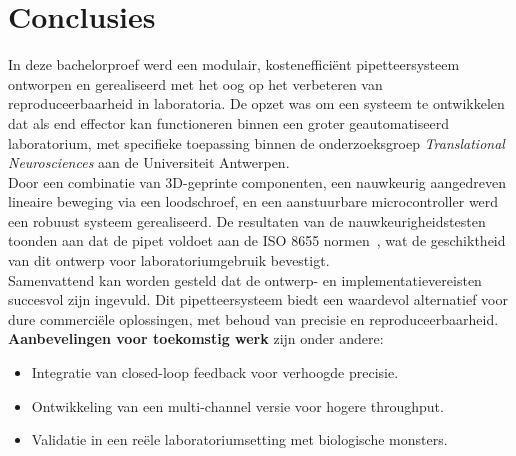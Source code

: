 \chapter{Conclusies}
In deze bachelorproef werd een modulair, kostenefficiënt pipetteersysteem ontworpen en gerealiseerd met het oog op het verbeteren van reproduceerbaarheid in laboratoria. De opzet was om een systeem te ontwikkelen dat als end effector kan functioneren binnen een groter geautomatiseerd laboratorium, met specifieke toepassing binnen de onderzoeksgroep \textit{Translational Neurosciences} aan de Universiteit Antwerpen.
\\[12pt]Door een combinatie van 3D-geprinte componenten, een nauwkeurig aangedreven lineaire beweging via een loodschroef, en een aanstuurbare microcontroller werd een robuust systeem gerealiseerd. De resultaten van de nauwkeurigheidstesten toonden aan dat de pipet voldoet aan de ISO 8655 normen\ \cite{RN50}, wat de geschiktheid van dit ontwerp voor laboratoriumgebruik bevestigt.
\\[12pt]Samenvattend kan worden gesteld dat de ontwerp- en implementatievereisten succesvol zijn ingevuld. Dit pipetteersysteem biedt een waardevol alternatief voor dure commerciële oplossingen, met behoud van precisie en reproduceerbaarheid.
\\[12pt]\textbf{Aanbevelingen voor toekomstig werk} zijn onder andere:
\begin{itemize}
  \item Integratie van closed-loop feedback voor verhoogde precisie.
  \item Ontwikkeling van een multi-channel versie voor hogere throughput.
  \item Validatie in een reële laboratoriumsetting met biologische monsters.
\end{itemize}